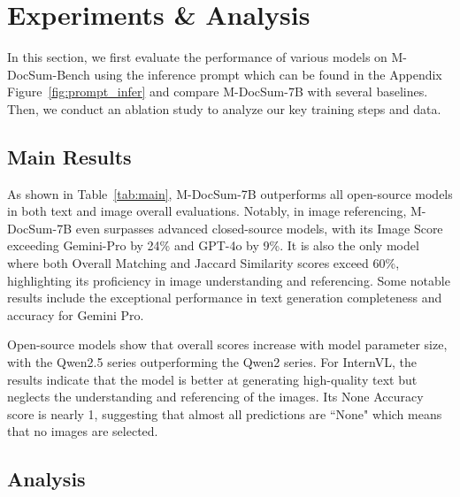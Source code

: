 
\section{Experiments \& Analysis}
In this section, we first evaluate the performance of various models on M-DocSum-Bench using the inference prompt which can be found in the Appendix Figure~\ref{fig:prompt_infer} and compare M-DocSum-7B with several baselines. 
Then, we conduct an ablation study to analyze our key training steps and data.


\subsection{Main Results}
As shown in Table~\ref{tab:main}, M-DocSum-7B outperforms all open-source models in both text and image overall evaluations. 
Notably, in image referencing, M-DocSum-7B even surpasses advanced closed-source models, with its Image Score exceeding Gemini-Pro by 24\% and GPT-4o by 9\%. 
It is also the only model where both Overall Matching and Jaccard Similarity scores exceed 60\%, highlighting its proficiency in image understanding and referencing.
Some notable results include the exceptional performance in text generation completeness and accuracy for Gemini Pro.

Open-source models show that overall scores increase with model parameter size, with the Qwen2.5 series outperforming the Qwen2 series. 
For InternVL, the results indicate that the model is better at generating high-quality text but neglects the understanding and referencing of the images. 
Its None Accuracy score is nearly 1, suggesting that almost all predictions are ``None" which means that no images are selected.



\subsection{Analysis}

